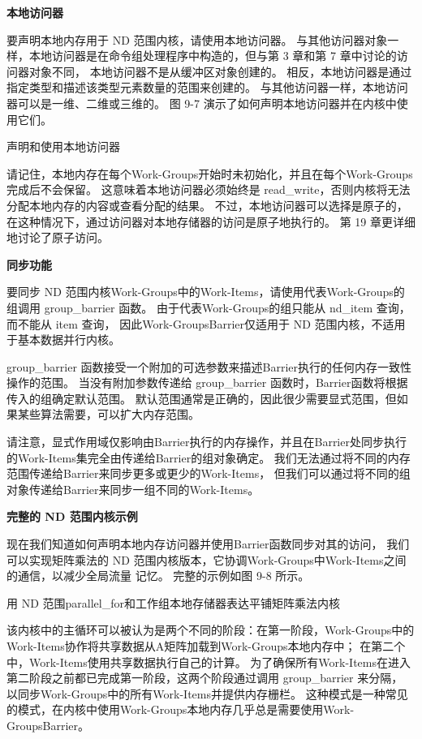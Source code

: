 \textbf{本地访问器}

要声明本地内存用于 ND 范围内核，请使用本地访问器。 
与其他访问器对象一样，本地访问器是在命令组处理程序中构造的，但与第 3 章和第 7 章中讨论的访问器对象不同，
本地访问器不是从缓冲区对象创建的。 相反，本地访问器是通过指定类型和描述该类型元素数量的范围来创建的。 
与其他访问器一样，本地访问器可以是一维、二维或三维的。 图 9-7 演示了如何声明本地访问器并在内核中使用它们。

{\color{red} 声明和使用本地访问器}

请记住，本地内存在每个Work-Groups开始时未初始化，并且在每个Work-Groups完成后不会保留。 
这意味着本地访问器必须始终是 read\_write，否则内核将无法分配本地内存的内容或查看分配的结果。 
不过，本地访问器可以选择是原子的，在这种情况下，通过访问器对本地存储器的访问是原子地执行的。 
第 19 章更详细地讨论了原子访问。

\textbf{同步功能}

要同步 ND 范围内核Work-Groups中的Work-Items，请使用代表Work-Groups的组调用 group\_barrier 函数。 
由于代表Work-Groups的组只能从 nd\_item 查询，而不能从 item 查询，
因此Work-GroupsBarrier仅适用于 ND 范围内核，不适用于基本数据并行内核。

group\_barrier 函数接受一个附加的可选参数来描述Barrier执行的任何内存一致性操作的范围。 
当没有附加参数传递给 group\_barrier 函数时，Barrier函数将根据传入的组确定默认范围。 
默认范围通常是正确的，因此很少需要显式范围，但如果某些算法需要，可以扩大内存范围。

请注意，显式作用域仅影响由Barrier执行的内存操作，并且在Barrier处同步执行的Work-Items集完全由传递给Barrier的组对象确定。 
我们无法通过将不同的内存范围传递给Barrier来同步更多或更少的Work-Items，
但我们可以通过将不同的组对象传递给Barrier来同步一组不同的Work-Items。

\textbf{完整的 ND 范围内核示例}

现在我们知道如何声明本地内存访问器并使用Barrier函数同步对其的访问，
我们可以实现矩阵乘法的 ND 范围内核版本，它协调Work-Groups中Work-Items之间的通信，以减少全局流量 记忆。 
完整的示例如图 9-8 所示。

{\color{red} 用 ND 范围parallel\_for和工作组本地存储器表达平铺矩阵乘法内核}

该内核中的主循环可以被认为是两个不同的阶段：在第一阶段，Work-Groups中的Work-Items协作将共享数据从A矩阵加载到Work-Groups本地内存中； 
在第二个中，Work-Items使用共享数据执行自己的计算。 
为了确保所有Work-Items在进入第二阶段之前都已完成第一阶段，这两个阶段通过调用 group\_barrier 来分隔，
以同步Work-Groups中的所有Work-Items并提供内存栅栏。 
这种模式是一种常见的模式，在内核中使用Work-Groups本地内存几乎总是需要使用Work-GroupsBarrier。

